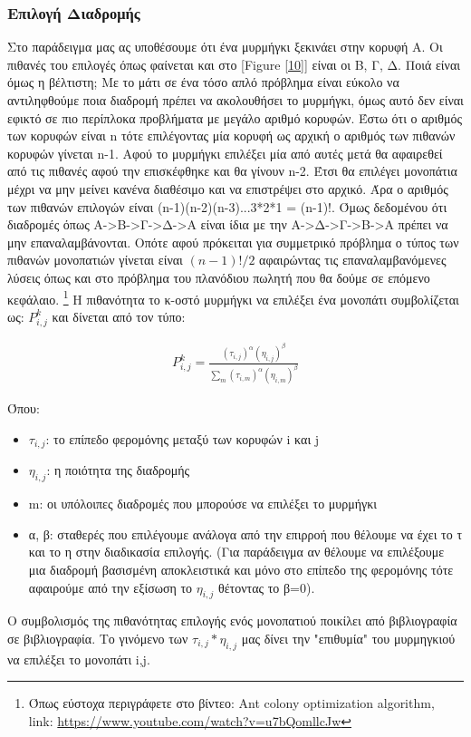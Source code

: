\subsubsection{Επιλογή Διαδρομής}
Στο παράδειγμα μας ας υποθέσουμε ότι ένα μυρμήγκι ξεκινάει στην κορυφή Α. Οι πιθανές του επιλογές όπως φαίνεται και στο [Figure \ref{10}] είναι οι Β, Γ, Δ. Ποιά είναι όμως η βέλτιστη; 
Με το μάτι σε ένα τόσο απλό πρόβλημα είναι εύκολο να αντιληφθούμε ποια διαδρομή πρέπει να ακολουθήσει το μυρμήγκι, όμως αυτό δεν είναι εφικτό σε πιο περίπλοκα προβλήματα με μεγάλο αριθμό κορυφών. Έστω ότι ο αριθμός των κορυφών είναι n τότε επιλέγοντας μία κορυφή ως αρχική ο αριθμός των πιθανών κορυφών γίνεται n-1. Αφού το μυρμήγκι επιλέξει μία από αυτές μετά θα αφαιρεθεί από τις πιθανές αφού την επισκέφθηκε και θα γίνουν n-2. Έτσι θα επιλέγει μονοπάτια μέχρι να μην μείνει κανένα διαθέσιμο και να επιστρέψει στο αρχικό. Άρα ο αριθμός των πιθανών επιλογών είναι (n-1)(n-2)(n-3)...3*2*1 = (n-1)!. Όμως δεδομένου ότι διαδρομές όπως Α->Β->Γ->Δ->Α είναι ίδια με την Α->Δ->Γ->Β->Α πρέπει να μην επαναλαμβάνονται. Οπότε αφού πρόκειται για συμμετρικό πρόβλημα ο τύπος των πιθανών μονοπατιών γίνεται είναι $(n-1)!/2$ αφαιρώντας τις επαναλαμβανόμενες λύσεις όπως και στο πρόβλημα του πλανόδιου πωλητή που θα δούμε σε επόμενο κεφάλαιο. \footnote{Όπως εύστοχα περιγράφετε στο βίντεο: Ant colony optimization algorithm, \\
link: \url{https://www.youtube.com/watch?v=u7bQomllcJw}}
Η πιθανότητα το κ-οστό μυρμήγκι να επιλέξει ένα μονοπάτι συμβολίζεται ως: $P^k_{i,j}$ και δίνεται από τον τύπο: \cite{chandrashekar2023hwacoa} \cite{blum2005ant}

\begin{align} \label{eq:3}
	P^k_{i,j}=\frac{(τ_{i,j})^α(η_{i,j})^β}{\sum_{m}(τ_{i,m})^α(η_{i,m})^β}
\end{align}

Όπου: 
\begin{itemize}
    \item $τ_{i,j}$: το επίπεδο φερομόνης μεταξύ των κορυφών i και j
    \item $η_{i,j}$: η ποιότητα της διαδρομής
    \item m: οι υπόλοιπες διαδρομές που μπορούσε να επιλέξει το μυρμήγκι
    \item α, β: σταθερές που επιλέγουμε ανάλογα από την επιρροή που θέλουμε να έχει το τ και το η στην διαδικασία επιλογής. (Για παράδειγμα αν θέλουμε να επιλέξουμε μια διαδρομή βασισμένη αποκλειστικά και μόνο στο επίπεδο της φερομόνης τότε αφαιρούμε από την εξίσωση το $η_{i,j}$ θέτοντας το β=0).
\end{itemize}
Ο συμβολισμός της πιθανότητας επιλογής ενός μονοπατιού ποικίλει από βιβλιογραφία σε βιβλιογραφία. 
Το γινόμενο των $τ_{i,j}*η_{i,j}$ μας δίνει την "επιθυμία" του μυρμηγκιού να επιλέξει το μονοπάτι i,j.

